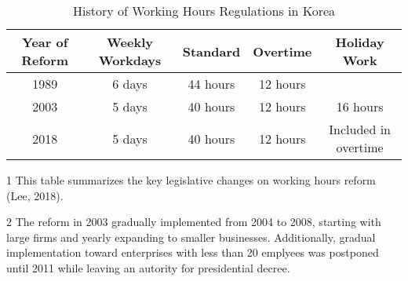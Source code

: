 \begin{table}[!h]
\centering\centering
\caption{History of Working Hours Regulations in Korea}
\centering
\fontsize{11}{13}\selectfont
\begin{threeparttable}
\begin{tabular}[t]{ccccc}
\toprule
Year of Reform & Weekly Workdays & Standard & Overtime & Holiday Work\\
\midrule
1989 & 6 days & 44 hours & 12 hours & \\
2003 & 5 days & 40 hours & 12 hours & 16 hours\\
2018 & 5 days & 40 hours & 12 hours & Included in overtime\\
\bottomrule
\end{tabular}
\begin{tablenotes}
\item[1] This table summarizes the key legislative changes on working hours reform (Lee, 2018).
\item[2] The reform in 2003 gradually implemented from 2004 to 2008, starting with large firms and yearly expanding to smaller businesses. Additionally, gradual implementation toward enterprises with less than 20 emplyees was postponed until 2011 while leaving an autority for presidential decree.
\end{tablenotes}
\end{threeparttable}
\end{table}
